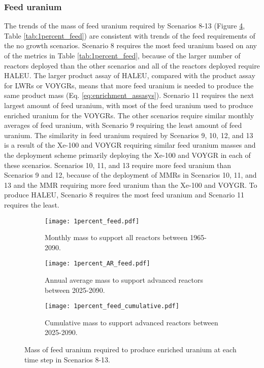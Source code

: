  

\subsubsection{Feed uranium}
The trends of the mass of feed uranium required by Scenarios 8-13 
(Figure \ref{fig:1percent_feed},
Table \ref{tab:1percent_feed}) are consistent with trends of the feed 
requirements of the no growth scenarios. Scenario 8 requires the 
most feed uranium based on any of the metrics in Table 
\ref{tab:1percent_feed}, because of the larger number of 
reactors deployed than the other scenarios and all of the reactors deployed 
require \gls{HALEU}. The larger product assay of \gls{HALEU}, compared with 
the product assay for \glspl{LWR} or VOYGRs, means that more 
feed uranium is needed to produce the same product mass (Eq. 
\ref{eq:enrichment_assasys}). Scenario 11 requires the next largest amount 
of feed uranium, with most of the feed uranium used to produce enriched 
uranium for the VOYGRs. The other scenarios require similar monthly 
averages of feed uranium, with Scenario 9 requiring the least amount of 
feed uranium. The similarity in feed uranium required by Scenarios 9, 10, 12, 
and 13 is a result of the Xe-100 and VOYGR requiring similar feed uranium masses 
and the deployment scheme primarily deploying the Xe-100 and VOYGR in each of 
these scenarios. Scenarios 10, 11, and 13 require more feed 
uranium than Scenarios 9 and 12, because of the deployment of \glspl{MMR} 
in Scenarios 10, 11, and 13 and the \gls{MMR} requiring more feed uranium than 
the Xe-100 and VOYGR. To produce \gls{HALEU}, Scenario 8 requires the most 
feed uranium and Scenario 11 requires the least.  

\begin{figure}[h!]
    \centering
    \begin{subfigure}[b]{0.45\textwidth}
        \centering
        \texttt{[image: 1percent\_feed.pdf]}
        \caption{Monthly mass to support
        all reactors between 1965-2090.}
        \label{fig:1percent_all_feed}
    \end{subfigure}
    \hfill
    \begin{subfigure}[b]{0.45\textwidth}
        \centering
        \texttt{[image: 1percent\_AR\_feed.pdf]}
        \caption{Annual average mass to support advanced reactors between 2025-2090.}
        \label{fig:1percent_AR_feed}
    \end{subfigure}
    \begin{subfigure}[b]{0.45\textwidth}
        \centering
        \texttt{[image: 1percent\_feed\_cumulative.pdf]}
        \caption{Cumulative mass to support 
        advanced reactors between 2025-2090.}
        \label{fig:1percent_feed_cumulative}
    \end{subfigure}
       \caption{Mass of feed uranium required to produce enriched uranium
       at each time step in Scenarios 8-13.}
       \label{fig:1percent_feed}
\end{figure}

